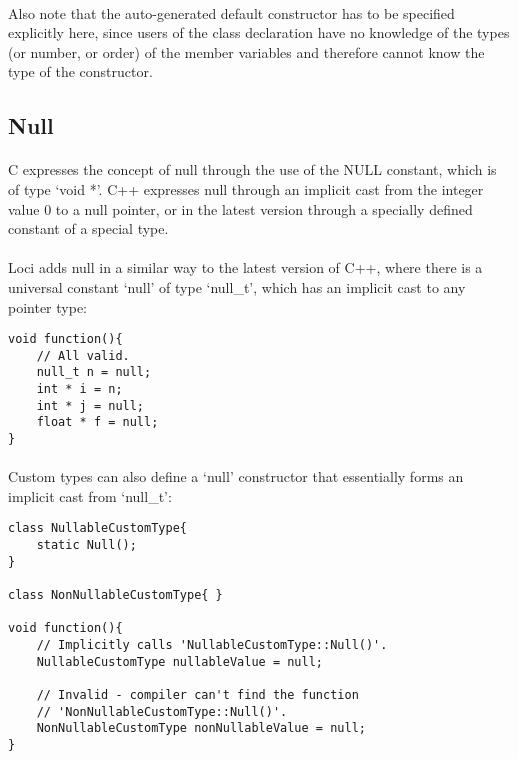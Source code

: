\documentclass[12pt,twoside,notitlepage]{report}
\begin{document}
\paragraph{}
Also note that the auto-generated default constructor has to be specified explicitly here, since users of the class declaration have no knowledge of the types (or number, or order) of the member variables and therefore cannot know the type of the constructor.

\clearpage

\subsection{Null}

\paragraph{}
C expresses the concept of null through the use of the NULL constant, which is of type `void *'. C++ expresses null through an implicit cast from the integer value 0 to a null pointer, or in the latest version through a specially defined constant of a special type.

\paragraph{}
Loci adds null in a similar way to the latest version of C++, where there is a universal constant `null' of type `null\_t', which has an implicit cast to any pointer type:


\begin{lstlisting}
void function(){
	// All valid.
	null_t n = null;
	int * i = n;
	int * j = null;
	float * f = null;
}
\end{lstlisting}


\paragraph{}
Custom types can also define a `null' constructor that essentially forms an implicit cast from `null\_t':

\begin{lstlisting}
class NullableCustomType{
	static Null();
}

class NonNullableCustomType{ }

void function(){
	// Implicitly calls 'NullableCustomType::Null()'.
	NullableCustomType nullableValue = null;
	
	// Invalid - compiler can't find the function
	// 'NonNullableCustomType::Null()'.
	NonNullableCustomType nonNullableValue = null;
}
\end{lstlisting}
\end{document}
